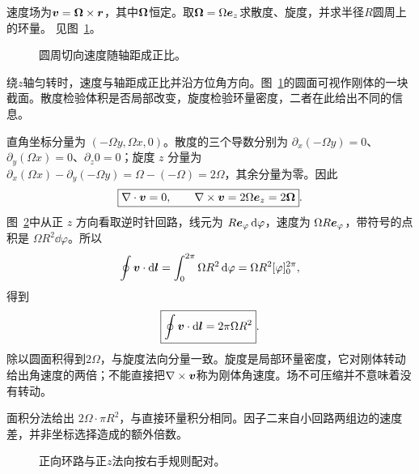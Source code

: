 \begin{exercise}[刚体转动场]\label{ex:c3-h9}
速度场为$\bm{v}=\bm{\Omega}\times\bm{r}$，其中$\bm{\Omega}$恒定。取$\bm{\Omega}=\Omega\bm{e}_z$求散度、旋度，并求半径$R$圆周上的环量。 见图~\ref{fig:c3-h9-q}。
\end{exercise}

\begin{figure}[H]\centering
{}
\caption{圆周切向速度随轴距成正比。}\label{fig:c3-h9-q}
\end{figure}
\begin{solution}
绕$z$轴匀转时，速度与轴距成正比并沿方位角方向。图~\ref{fig:c3-h9-q}的圆面可视作刚体的一块截面。散度检验体积是否局部改变，旋度检验环量密度，二者在此给出不同的信息。


直角坐标分量为 $(-\Omega y,\Omega x,0)$。散度的三个导数分别为 $\partial_x(-\Omega y)=0$、$\partial_y(\Omega x)=0$、$\partial_z0=0$；旋度 $z$ 分量为 $\partial_x(\Omega x)-\partial_y(-\Omega y)=\Omega-(-\Omega)=2\Omega$，其余分量为零。因此
\[\boxed{\nabla\cdot\bm{v}=0,\qquad\nabla\times\bm{v}=2\Omega\bm{e}_z=2\bm{\Omega}}.
\]
图~\ref{fig:c3-h9-s}中从正 $z$ 方向看取逆时针回路，线元为 $R\bm{e}_\varphi\mathop{}\!\mathrm d\varphi$，速度为 $\Omega R\bm{e}_\varphi$，带符号的点积是 $\Omega R^2\dd\varphi$。所以
\[
\oint\bm{v}\cdot\mathop{}\!\mathrm d\bm{l}=\int_0^{2\pi}\Omega R^2\mathop{}\!\mathrm d\varphi
=\Omega R^2[\varphi]_0^{2\pi},
\]
得到
\[\boxed{\oint\bm{v}\cdot\mathop{}\!\mathrm d\bm{l}=2\pi\Omega R^2}.
\]
除以圆面积得到$2\Omega$，与旋度法向分量一致。旋度是局部环量密度，它对刚体转动给出角速度的两倍；不能直接把$\nabla\times\bm{v}$称为刚体角速度。场不可压缩并不意味着没有转动。


面积分法给出 $2\Omega\cdot\pi R^2$，与直接环量积分相同。因子二来自小回路两组边的速度差，并非坐标选择造成的额外倍数。

\begin{figure}[H]\centering
{}
\caption{正向环路与正$z$法向按右手规则配对。}\label{fig:c3-h9-s}
\end{figure}
\end{solution}

